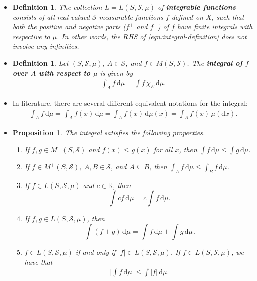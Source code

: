 \documentclass[10pt]{article}
\newtheorem{definition}[lemma]{Definition}
\newtheorem{proposition}[lemma]{Proposition}
\newcommand{\dee}{\mathrm{d}}
\newcommand{\mcal}[1]{\mathcal{#1}}
\newcommand{\Real}{\mathbb{R}}
\begin{document}
\begin{itemize}
  \item \begin{definition}
    The collection $L = L(S,\mcal{S},\mu)$ of {\bf integrable functions} consists of all real-valued $\mcal{S}$-measurable functions $f$ defined on $X$, such that both the positive and negative parts ($f^+$ and $f^-$) of $f$ have finite integrals with respective to $\mu$. In other words, the RHS of \eqref{eqn:integral-definition} does not involve any infinities.
  \end{definition}

  \item \begin{definition}
    Let $(S,\mcal{S},\mu)$, $A \in \mcal{S}$, and $f \in M(S,\mcal{S})$. The {\bf integral of $f$ over $A$ with respect to $\mu$} is given by
    \begin{align*}
      \int_A f\, \dee\mu = \int f\,\chi_E\, \dee\mu.
    \end{align*}
  \end{definition}

  \item In literature, there are several different equivalent notations for the integral:
  \begin{align*}
    \int_A f\, \dee\mu = \int_A f(x)\, \dee\mu = \int_A f(x)\,\dee\mu(x) = \int_A f(x)\, \mu(\dee x).
  \end{align*}

  \item \begin{proposition}
    The integral satisfies the following properties.
    \begin{enumerate}
      \item If $f,g \in M^+(S, \mcal{S})$ and $f(x) \leq g(x)$ for all $x$, then $\int f\, \dee\mu \leq \int g\, \dee\mu$.
      
      \item If $f \in M^+(S,\mcal{S})$, $A,B \in \mcal{S}$, and $A \subseteq B$, then $\int_A f\,\dee\mu \leq \int_B f\,\dee\mu$.
      
      \item If $f \in L(S,\mcal{S},\mu)$ and $c \in \Real$, then $$\int cf\, \dee\mu = c \int f\, \dee\mu.$$
      
      \item If $f,g \in L(S,\mcal{S},\mu)$, then $$\int (f+g)\, \dee\mu = \int f\, \dee\mu + \int g\, \dee\mu.$$
      \item $f \in L(S,\mcal{S},\mu)$ if and only if $|f| \in L(S,\mcal{S},\mu)$. If $f \in L(S,\mcal{S},\mu)$, we have that
      \begin{align*}
        \bigg|\int f\, \dee\mu\bigg| \leq \int |f|\, \dee\mu.
      \end{align*}


\end{enumerate}
\end{proposition}
\end{itemize}
\end{document}
